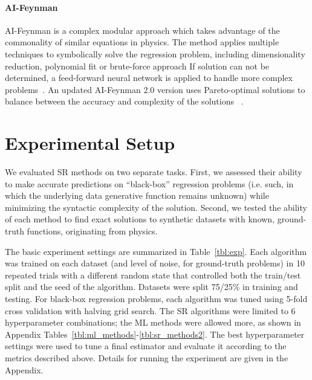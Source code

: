 \paragraph{AI-Feynman}
AI-Feynman is a complex modular approach which takes advantage of the commonality of similar equations in physics. 
The method applies multiple techniques to symbolically solve the regression problem, including dimensionality reduction, polynomial fit or brute-force approach
If solution can not be determined, a feed-forward neural network is applied to handle more complex problems~\cite{udrescuAIFeynmanPhysicsInspired2020}.
An updated AI-Feynman 2.0 version uses Pareto-optimal solutions to balance between the accuracy and complexity of the solutions ~\cite{udrescuAIFeynmanParetooptimal2020}.




\section{Experimental Setup}

We evaluated SR methods on two separate tasks. 
First, we assessed their ability to make accurate predictions on ``black-box'' regression problems (i.e. such, in which the underlying data generative function remains unknown) while minimizing the syntactic complexity of the solution. 
Second, we tested the ability of each method to find exact solutions to synthetic datasets with known, ground-truth functions, originating from physics. 

The basic experiment settings are summarized in Table~\ref{tbl:exp}.
Each algorithm was trained on each dataset (and level of noise, for ground-truth problems) in 10 repeated trials with a different random state that controlled both the train/test split and the seed of the algorithm.  
Datasets were split 75/25\% in training and testing. 
For black-box regression problems, each algorithm was tuned using 5-fold cross validation with halving grid search. 
The SR algorithms were limited to 6 hyperparameter combinations; the ML methods were allowed more, as shown in Appendix Tables~\ref{tbl:ml_methods}-\ref{tbl:sr_methods2}. 
The best hyperparameter settings were used to tune a final estimator and evaluate it according to the metrics described above. 
Details for running the experiment are given in the Appendix. 


